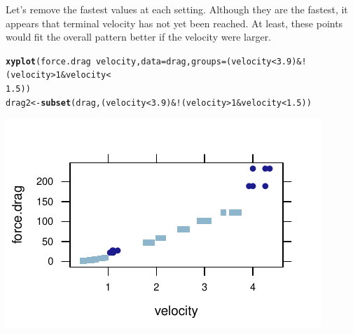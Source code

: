\documentclass[twoside]{book}\usepackage[]{graphicx}\usepackage[]{xcolor}
\makeatletter
\def\maxwidth{ %
  \ifdim\Gin@nat@width>\linewidth
    \linewidth
  \else
    \Gin@nat@width
  \fi
}
\newcommand{\hlnum}[1]{\textcolor[rgb]{0.686,0.059,0.569}{#1}}%
\newcommand{\hlopt}[1]{\textcolor[rgb]{0,0,0}{#1}}%
\newcommand{\hlstd}[1]{\textcolor[rgb]{0.345,0.345,0.345}{#1}}%
\newcommand{\hlkwb}[1]{\textcolor[rgb]{0.69,0.353,0.396}{#1}}%
\newcommand{\hlkwc}[1]{\textcolor[rgb]{0.333,0.667,0.333}{#1}}%
\newcommand{\hlkwd}[1]{\textcolor[rgb]{0.737,0.353,0.396}{\textbf{#1}}}%
\newenvironment{kframe}{%
 \def\at@end@of@kframe{}%
 \ifinner\ifhmode%
  \def\at@end@of@kframe{\end{minipage}}%
  \begin{minipage}{\columnwidth}%
 \fi\fi%
 \def\FrameCommand##1{\hskip\@totalleftmargin \hskip-\fboxsep
 \colorbox{shadecolor}{##1}\hskip-\fboxsep
     \hskip-\linewidth \hskip-\@totalleftmargin \hskip\columnwidth}%
 \MakeFramed {\advance\hsize-\width
   \@totalleftmargin\z@ \linewidth\hsize
   \@setminipage}}%
 {\par\unskip\endMakeFramed%
 \at@end@of@kframe}
\newenvironment{knitrout}{}{} %
\makeatother
\begin{document}
\begin{solution}
Let's remove the fastest values at each setting.  Although they are the fastest, it appears 
that terminal velocity has not yet been reached.  At least, these points would fit the 
overall pattern better if the velocity were larger.
\begin{knitrout}
\color{fgcolor}\begin{kframe}
\begin{alltt}
\hlkwd{xyplot}\hlstd{(force.drag} \hlopt{~} \hlstd{velocity,} \hlkwc{data} \hlstd{= drag,} \hlkwc{groups} \hlstd{= (velocity} \hlopt{<} \hlnum{3.9}\hlstd{)} \hlopt{& !}\hlstd{(velocity} \hlopt{>} \hlnum{1} \hlopt{&} \hlstd{velocity} \hlopt{<}
    \hlnum{1.5}\hlstd{))}
\hlstd{drag2} \hlkwb{<-} \hlkwd{subset}\hlstd{(drag, (velocity} \hlopt{<} \hlnum{3.9}\hlstd{)} \hlopt{& !}\hlstd{(velocity} \hlopt{>} \hlnum{1} \hlopt{&} \hlstd{velocity} \hlopt{<} \hlnum{1.5}\hlstd{))}
\end{alltt}
\end{kframe}

{\centering \includegraphics[width=\maxwidth]{figures/fig-unnamed-chunk-268-1} 

}




\end{knitrout}
\end{solution}
\end{document}

